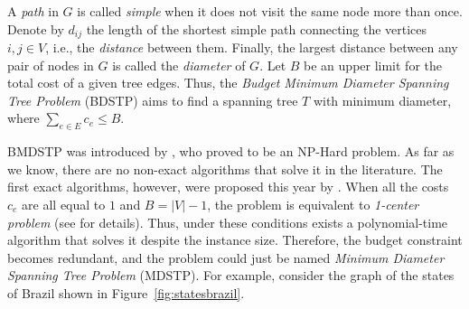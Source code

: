 \documentclass[12pt]{article}
\begin{document}
A \emph{path} in $G$ is called \emph{simple} when it does not visit the same node more than once. Denote by $d_{ij}$ the length of the shortest simple path connecting the vertices $i,j \in V$, i.e., the \emph{distance} between them. Finally, the largest distance between any pair of nodes in $G$ is called the \emph{diameter} of $G$. Let $B$ be an upper limit for the total cost of a given tree edges. Thus, the \emph{Budget Minimum Diameter Spanning Tree Problem} (BDSTP) aims to find a spanning tree $T$ with minimum diameter, where $\sum_{e\in E} c_e \leq B$. 

BMDSTP was introduced by \cite{Plesnik1981}, who proved to be an NP-Hard problem. As far as we know, there are no non-exact algorithms that solve it in the literature. The first exact algorithms, however, were proposed this year by \cite{Amanda2021}. When all the costs $c_e$ are all equal to $1$ and $B = |V|-1$, the problem is equivalent to \emph{1-center problem} (see \cite{Hakimi1978} for details). Thus, 
under these conditions exists a polynomial-time algorithm that solves it despite the instance size. Therefore, the budget constraint becomes redundant, and the problem could just be named \emph{Minimum Diameter Spanning Tree Problem} (MDSTP). For example, consider the graph of the states of Brazil shown in Figure~\ref{fig:statesbrazil}.
\end{document}
